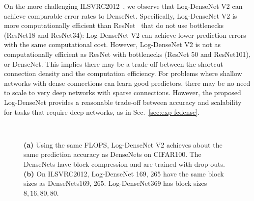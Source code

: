 \documentclass{article}
\newcommand{\logdense}{Log-DenseNet\xspace}
\newcommand{\logdensenp}{Log-DenseNet}
\newcommand{\loglogdense}{LogLog-DenseNet\xspace}
\newcommand{\pbd}{MBD\xspace}
\begin{document}
On the more challenging ILSVRC2012~\citep{ilsvrc}, we observe that \logdense V2 can achieve comparable error rates to DenseNet. Specifically, \logdense V2 is more computationally efficient than ResNet~\citep{resnet} that do not use bottlenecks (ResNet18 and ResNet34): \logdense V2 can achieve lower prediction errors with the same computational cost. However, \logdense V2 is not as computationally efficient as ResNet with bottlenecks (ResNet 50 and ResNet101), or DenseNet. This implies there may be a trade-off between the shortcut connection density and the computation efficiency. For problems where shallow networks with dense connections can learn good predictors, there may be no need to scale to very deep networks with sparse connections. However, the proposed \logdense  provides a reasonable trade-off between  accuracy and scalability for tasks that require deep networks, as in Sec.~\ref{sec:exp-fcdense}. 







\begin{figure}[t]
    \centering
    ~
    \caption{\textbf{(a)} Using the same FLOPS, \logdense V2 achieves about the same prediction accuracy as DenseNets on CIFAR100. The DenseNets have block compression and are trained with drop-outs. \textbf{(b)} On ILSVRC2012, \logdense169, 265 have the same block sizes as DenseNets169, 265. \logdensenp369 has block sizes $8,16, 80, 80$. }
    \vspace{-10pt}
\end{figure}
\end{document}
